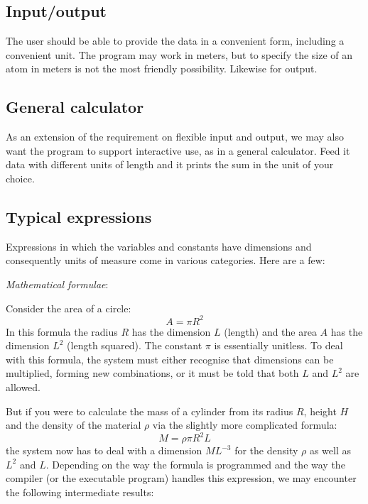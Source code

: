 \documentclass{article}
\begin{document}
\subsection*{Input/output}
The user should be able to provide the data in a convenient form, including a convenient unit. The program may work in meters,
but to specify the size of an atom in meters is not the most friendly possibility. Likewise for output.

\subsection*{General calculator}
As an extension of the requirement on flexible input and output, we may also want the program to support interactive use,
as in a general calculator. Feed it data with different units of length and it prints the sum in the unit of your choice.

\subsection*{Typical expressions}
Expressions in which the variables and constants have dimensions and consequently units of measure come in various
categories. Here are a few:

\vspace{\baselineskip}
\noindent \emph{Mathematical formulae}:

\noindent Consider the area of a circle:
\begin{equation}
    A = \pi R^2
\end{equation}
%
In this formula the radius $R$ has the dimension $L$ (length) and the area $A$ has the dimension $L^2$ (length squared). The
constant $\pi$ is essentially unitless. To deal with this formula, the system must either recognise that dimensions can
be multiplied, forming new combinations, or it must be told that both $L$ and $L^2$ are allowed.

But if you were to calculate the mass of a cylinder from its radius $R$, height $H$ and the density of the material $\rho$
via the slightly more complicated formula:
\begin{equation}
    M = \rho \pi R^2 L
\end{equation}
\noindent the system now has to deal with a dimension $M L^{-3}$ for the density $\rho$ as well as $L^2$ and $L$. Depending on the way the
formula is programmed and the way the compiler (or the executable program) handles this expression, we may encounter the
following intermediate results:
\end{document}
